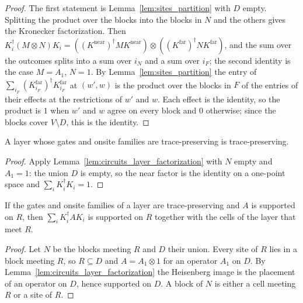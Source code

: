 \begin{proof}\leanok
    The first statement is Lemma~\ref{lem:sites_partition} with $D$ empty.
    Splitting the product over the blocks into the blocks in $N$ and the others
    gives the Kronecker factorization. Then
    $K_i^\dagger(M\otimes N)K_i=((K^{\mathrm{near}})^\dagger MK^{\mathrm{near}})
    \otimes((K^{\mathrm{far}})^\dagger NK^{\mathrm{far}})$, and the sum over the
    outcomes splits into a sum over $i_N$ and a sum over $i_F$; the second identity is
    the case $M=A_1$, $N=1$. By
    Lemma~\ref{lem:sites_partition} the entry of
    $\sum_{i_F}(K^{\mathrm{far}}_{i_F})^\dagger K^{\mathrm{far}}_{i_F}$ at $(w',w)$
    is the product over the blocks in $F$ of the entries of their effects at the
    restrictions of $w'$ and $w$. Each effect is the identity, so the product is
    $1$ when $w'$ and $w$ agree on every block and $0$ otherwise; since the blocks
    cover $V\setminus D$, this is the identity.
\end{proof}

\begin{theorem}
    \label{thm:circuits_layer_tp}
    \leanok
    A layer whose gates and onsite families are trace-preserving is
    trace-preserving.
\end{theorem}
\begin{proof}\leanok
    Apply Lemma~\ref{lem:circuits_layer_factorization} with $N$ empty and
    $A_1=1$: the union $D$ is empty, so the near factor is the identity on a
    one-point space and $\sum_iK_i^\dagger K_i=1$.
\end{proof}

\begin{theorem}
    \label{thm:circuits_layer_light_cone}
    \leanok
    If the gates and onsite families of a layer are trace-preserving and $A$ is
    supported on $R$, then $\sum_iK_i^\dagger AK_i$ is supported on $R$ together
    with the cells of the layer that meet $R$.
\end{theorem}
\begin{proof}\leanok
    Let $N$ be the blocks meeting $R$ and $D$ their union. Every site of $R$ lies in
    a block meeting $R$, so $R\subseteq D$ and $A=A_1\otimes1$ for an operator
    $A_1$ on $D$. By Lemma~\ref{lem:circuits_layer_factorization} the Heisenberg
    image is the placement of an operator on $D$, hence supported on $D$. A block
    of $N$ is either a cell meeting $R$ or a site of $R$.
\end{proof}

